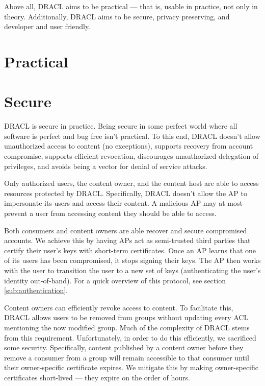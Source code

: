\documentclass[pdftex,12pt,a4papaer]{report}
\begin{document}
Above all, DRACL aims to be practical --- that is, usable in practice, not only
in theory. Additionally, DRACL aims to be secure, privacy preserving, and
developer and user friendly.

\section{Practical}


\section{Secure}
\label{sub:secure}

DRACL is secure in practice. Being secure in some perfect world where all
software is perfect and bug free isn't practical. To this end, DRACL doesn't
allow unauthorized access to content (no exceptions), supports recovery from
account compromise, supports efficient revocation, discourages unauthorized
delegation of privileges, and avoids being a vector for denial of service
attacks.

Only authorized users, the content owner, and the content host are able to
access resources protected by DRACL\@. Specifically, DRACL doesn't allow the AP
to impersonate its users and access their content. A malicious AP may at most
prevent a user from accessing content they should be able to access.

Both consumers and content owners are able recover and secure compromised
accounts. We achieve this by having APs act as semi-trusted third parties that
certify their user's keys with short-term certificates. Once an AP learns that
one of its users has been compromised, it stops signing their keys. The AP then
works with the user to transition the user to a new set of keys (authenticating
the user's identity out-of-band). For a quick overview of this protocol, see
section \ref{sub:authentication}.

Content owners can efficiently revoke access to content. To facilitate this,
DRACL allows users to be removed from groups without updating every ACL
mentioning the now modified group. Much of the complexity of DRACL stems from
this requirement. Unfortunately, in order to do this efficiently, we sacrificed
some security. Specifically, content published by a content owner before they
remove a consumer from a group will remain accessible to that consumer until
their owner-specific certificate expires. We mitigate this by making
owner-specific certificates short-lived --- they expire on the order of hours.
\end{document}

